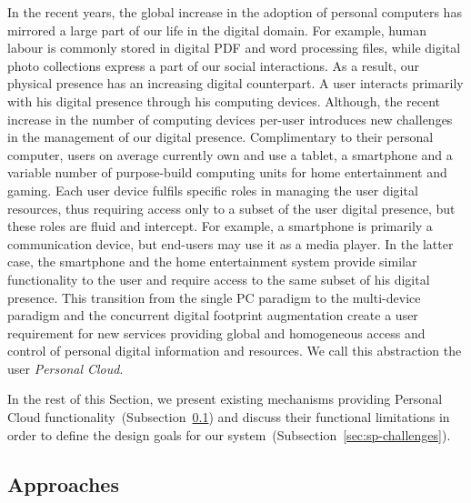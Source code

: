 In the recent years, the global increase in the adoption of personal computers
has mirrored a large part of our life in the digital domain. For example, human
labour is commonly stored in digital PDF and word processing files, while
digital photo collections express a part of our social interactions.  As a
result, our physical presence has an increasing digital counterpart. A user
interacts primarily with his digital presence through his computing
devices. Although, the recent increase in the number of computing devices per-user
introduces new challenges in the management of our digital presence.
Complimentary to their personal computer, users on average currently own and use
a tablet, a smartphone and a variable number of purpose-build computing units
for home entertainment and gaming.  Each user device fulfils specific
roles in managing the user digital resources, thus requiring access only to a subset of the user digital
presence, but these roles are fluid and intercept.  For example, a smartphone is
primarily a communication device, but end-users may use it as a media player. In
the latter case, the smartphone and the home entertainment system provide
similar functionality to the user and require access to the same subset of his
digital presence. This transition from the single PC paradigm to the
multi-device paradigm and the concurrent digital footprint augmentation create a
user requirement for new services providing global and homogeneous access and
control of personal digital information and resources. We call this abstraction
the user \emph{Personal Cloud}. 

In the rest of this Section, we present existing mechanisms providing Personal
Cloud functionality~(Subsection~\ref{sec:sp-approaches}) and discuss their
functional limitations in order to define the design goals for our \signpost
system~(Subsection~\ref{sec:sp-challenges}). 

\subsection{Approaches} \label{sec:sp-approaches}


